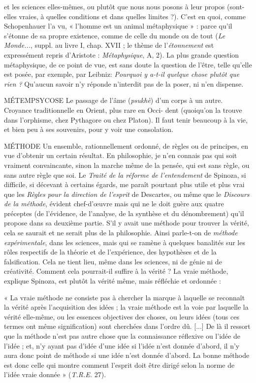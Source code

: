 et les sciences elles-mêmes, ou plutôt que nous nous posons à leur
propos (sont-elles vraies, à quelles conditions et dans quelles limites ?). C’est en
quoi, comme Schopenhauer l’a vu, « l’homme est un animal métaphysique » :
parce qu’il s'étonne de sa propre existence, comme de celle du monde ou de
tout ({\it Le Monde...}, suppl. au livre I, chap. XVII ; le thème de l’{\it étonnement} est
expressément repris d’Aristote : {\it Métaphysique}, A, 2). La plus grande question
métaphysique, de ce point de vue, est sans doute la question de l’être, telle
qu’elle est posée, par exemple, par Leibniz: {\it Pourquoi y a-t-il quelque chose
plutôt que rien ?} Qu’aucun savoir n’y réponde n’interdit pas de la poser, ni n’en
dispense.

MÉTEMPSYCOSE Le passage de l’âme ({\it psukhè}) d’un corps à un autre.
Croyance traditionnelle en Orient, plus rare en Occi-
dent (quoiqu’on la trouve dans l’orphisme, chez Pythagore ou chez Platon). Il
faut tenir beaucoup à la vie, et bien peu à ses souvenirs, pour y voir une consolation.

MÉTHODE Un ensemble, rationnellement ordonné, de règles ou de principes,
en vue d'obtenir un certain résultat. En philosophie, je
n’en connais pas qui soit vraiment convaincante, sinon la marche même de la
pensée, qui est sans règle, ou sans autre règle que soi. Le {\it Traité de la réforme de
l'entendement} de Spinoza, si difficile, si décevant à certains égards, me paraît
pourtant plus utile et plus vrai que les {\it Règles pour la direction de l'esprit} de Descartes,
ou même que le {\it Discours de la méthode}, évident chef-d'œuvre mais qui
ne le doit guère aux quatre préceptes (de l'évidence, de l’analyse, de la synthèse
et du dénombrement) qu’il propose dans sa deuxième partie. S’il y avait une
méthode pour trouver la vérité, cela se saurait et ne serait plus de la philosophie.
Ainsi parle-t-on de {\it méthode expérimentale}, dans les sciences, mais qui se
ramène à quelques banalités sur les rôles respectifs de la théorie et de l’expérience,
des hypothèses et de la falsification. Cela ne tient lieu, même dans les
sciences, ni de génie ni de créativité. Comment cela pourrait-il suffire à la
vérité ? La vraie méthode, explique Spinoza, est plutôt la vérité même, mais
réfléchie et ordonnée :

{\footnotesize
« La vraie méthode ne consiste pas à chercher la marque à laquelle se reconnaît la
vérité après l’acquisition des idées ; la vraie méthode est la voie par laquelle la vérité
elle-même, ou les essences objectives des choses, ou leurs idées (tous ces termes ont même
signification) sont cherchées dans l’ordre dû. [...] De là il ressort que la méthode n’est
pas autre chose que la connaissance réflexive ou l’idée de l’idée ; et, n’y ayant pas d’idée
d’une idée si l’idée n’est donnée d’abord, il n’y aura donc point de méthode si une idée
n’est donnée d’abord. La bonne méthode est donc celle qui montre comment l'esprit
doit être dirigé selon la norme de l’idée vraie donnée » ({\it T.R.E.} 27).
}\\

